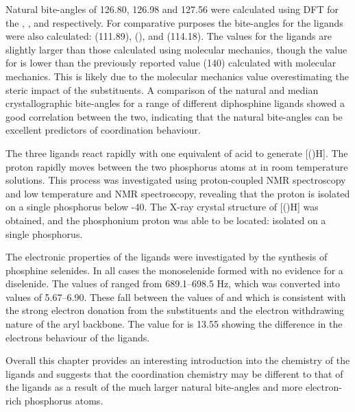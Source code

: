 Natural bite-angles of 126.80, 126.98 and 127.56\degrees{} were calculated using DFT for the \tBusixantphos{}, \tButhixantphos, and \tBuxantphos{} respectively.  For comparative purposes the bite-angles for the \Phxantphos{} ligands were also calculated: \Phsixantphos{} (111.89\degrees), \Phthixantphos{} (), and \Phxantphos{} (114.18\degrees).  The values for the \Phxantphos{} ligands are slightly larger than those calculated using molecular mechanics, though the value for \tBuxantphos{} is lower than the previously reported value (140\degrees) calculated with molecular mechanics.  This is likely due to the molecular mechanics value overestimating the steric impact of the \tBu{} substituents.  A comparison of the natural and median crystallographic bite-angles for a range of different diphosphine ligands showed a good correlation between the two, indicating that the natural bite-angles can be excellent predictors of coordination behaviour.  

The three \tBuxantphos{} ligands react rapidly with one equivalent of acid to generate [(\tBuxantphos)H].  The proton rapidly moves between the two phosphorus atoms at in room temperature solutions.  This process was investigated using proton-coupled \phosphorus{} NMR spectroscopy and low temperature \proton{} and \phosphorus{} NMR spectroscopy, revealing that the proton is isolated on a single phosphorus below -40\degC.  The X-ray crystal structure of [(\tButhixantphos)H] was obtained, and the phosphonium proton was able to be located: isolated on a single phosphorus.  

The electronic properties of the \tBuxantphos{} ligands were investigated by the synthesis of phosphine selenides.  In all cases the monoselenide formed with no evidence for a diselenide.  The values of \JPSe{} ranged from 689.1--698.5 Hz, which was converted into \pKb{} values of 5.67--6.90.  These fall between the values of  and  which is consistent with the strong electron donation from the \tBu{} substituents and the electron withdrawing nature of the aryl backbone.  The \pKb{} value for \Phxantphos{} is 13.55 showing the difference in the electrons behaviour of the \tBuxantphos{} ligands.

Overall this chapter provides an interesting introduction into the chemistry of the \tBuxantphos{} ligands and suggests that the coordination chemistry may be different to that of the \Phxantphos{} ligands as a result of the much larger natural bite-angles and more electron-rich phosphorus atoms.  














